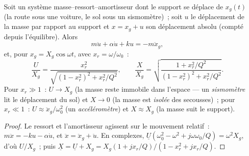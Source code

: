 \begin{proposition}\label{prop:b1:oscillators-resonance:base}
Soit un système masse--ressort--amortisseur dont le support se déplace
de $x_g(t)$ (la route sous une voiture, le sol sous un sismomètre)~;
soit $u$ le déplacement de la masse par rapport au support et
$x = x_g + u$ son déplacement absolu (compté depuis l'équilibre). Alors
\[
m\ddot u + \alpha\dot u + ku = -m\ddot x_g ,
\]
et, pour $x_g = X_g\cos\omega t$, avec $x_r = \omega/\omega_0$~:
\[
\frac{U}{X_g} = \frac{x_r^2}{\sqrt{(1 - x_r^2)^2 + x_r^2/Q^2}},
\qquad
\frac{X}{X_g} = \sqrt{\frac{1 + x_r^2/Q^2}{(1 - x_r^2)^2 + x_r^2/Q^2}} .
\]
Pour $x_r \gg 1$~: $U \to X_g$ (la masse reste immobile dans l'espace ---
un \emph{sismomètre} lit le déplacement du sol) et $X \to 0$ (la masse
est \emph{isolée} des secousses)~; pour $x_r \ll 1$~: $U \approx
\ddot x_g/\omega_0^2$ (un \emph{accéléromètre}) et $X \approx X_g$ (la
masse suit le support).
\end{proposition}

\begin{proof}
Le ressort et l'amortisseur agissent sur le mouvement relatif~: $m\ddot x = -ku -
\alpha\dot u$, et $\ddot x = \ddot x_g + \ddot u$. En complexes,
$\underline U(\omega_0^2 - \omega^2 + j\omega\omega_0/Q) = \omega^2X_g$, d'où
$U/X_g$~; puis $\underline X = \underline U + X_g = X_g(1 + jx_r/Q)/(1 -
x_r^2 + jx_r/Q)$.
\end{proof}

